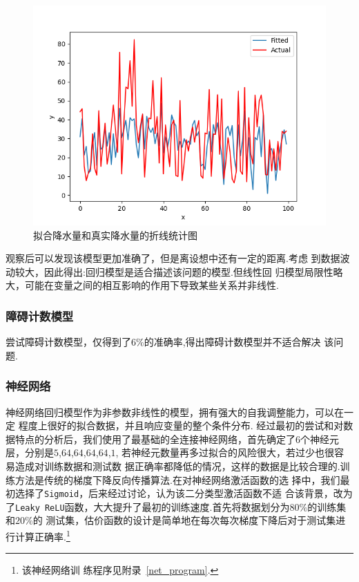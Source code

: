 \documentclass[UTF8, a4paper]{ctexart}
\begin{document}
\begin{figure}[h!]
	\centering
	\includegraphics[scale=0.3]{../src/try_match/ols_five.png}
	\caption{拟合降水量和真实降水量的折线统计图}
\end{figure}

观察后可以发现该模型更加准确了，但是离设想中还有一定的距离.考虑
到数据波动较大，因此得出:回归模型是适合描述该问题的模型.但线性回
归模型局限性略大，可能在变量之间的相互影响的作用下导致某些关系并非线性.

\subsubsection{障碍计数模型}

尝试障碍计数模型，仅得到了$6\%$的准确率,得出障碍计数模型并不适合解决
该问题.

\subsubsection{神经网络}

神经网络回归模型作为非参数非线性的模型，拥有强大的自我调整能力，可以在一定
程度上很好的拟合数据，并且响应变量的整个条件分布.
经过最初的尝试和对数据特点的分析后，我们使用了最基础的全连接神经网络，首先确定了$6$个神经元层，分别是$5$,$64$,$64$,$64$,$64$,$1$,
若神经元数量再多过拟合的风险很大，若过少也很容易造成对训练数据和测试数
据正确率都降低的情况，这样的数据是比较合理的.训练方法是传统的梯度下降反向传播算法.在对神经网络激活函数的选
择中，我们最初选择了\verb+Sigmoid+，后来经过讨论，认为该二分类型激活函数不适
合该背景，改为了\verb+Leaky ReLU+函数，大大提升了最初的训练速度.首先将数据划分为$80\%$的训练集和$20\%$的
测试集，估价函数的设计是简单地在每次每次梯度下降后对于测试集进行计算正确率.\footnote{该神经网络训
	练程序见附录~\textcolor{red}{\ref{net_program}}.}
\end{document}
